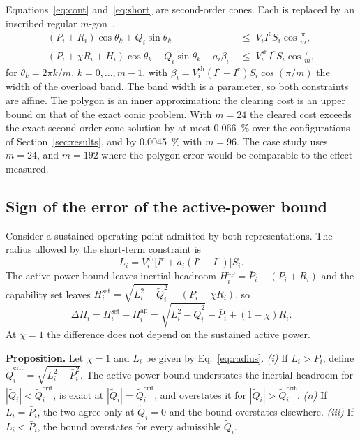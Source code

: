 Equations~\eqref{eq:cont} and~\eqref{eq:short} are second-order cones. Each
is replaced by an inscribed regular $m$-gon~\cite{bental2001polyhedral},
%
\begin{align}
  (P_i + R_i)\cos\theta_k + Q_i \sin\theta_k
    &\;\le\; V_i I^{\mathrm{c}} S_i \cos\tfrac{\pi}{m} ,
  \label{eq:polygon} \\
  (P_i + \chi R_i + H_i)\cos\theta_k + \tilde{Q}_i \sin\theta_k
    - a_i \beta_i
    &\;\le\; V^{\mathrm{sh}}_i I^{\mathrm{c}} S_i \cos\tfrac{\pi}{m} ,
  \label{eq:polygon-short}
\end{align}
%
for $\theta_k = 2\pi k / m$, $k = 0, \dots, m-1$, with
$\beta_i = V^{\mathrm{sh}}_i (I^{\mathrm{s}} - I^{\mathrm{c}}) S_i
\cos(\pi/m)$ the width of the overload band. The band width is a parameter,
so both constraints are affine. The polygon is an inner approximation: the
clearing cost is an upper bound on that of the exact conic problem. With
$m = 24$ the cleared cost exceeds the exact second-order cone solution by at
most \SI{0.066}{\percent} over the configurations of
Section~\ref{sec:results}, and by \SI{0.0045}{\percent} with $m = 96$. The case
study uses $m = 24$, and $m = 192$ where the polygon error would be comparable
to the effect measured.

\subsection{Sign of the error of the active-power bound}
\label{sec:sign}

Consider a sustained operating point admitted by both representations. The
radius allowed by the short-term constraint is
%
\begin{equation}
  L_i = V^{\mathrm{sh}}_i \big[ I^{\mathrm{c}}
        + a_i (I^{\mathrm{s}} - I^{\mathrm{c}}) \big] S_i .
  \label{eq:radius}
\end{equation}
%
The active-power bound leaves inertial headroom
$H^{\mathrm{ap}}_i = \bar{P}_i - (P_i + R_i)$ and the capability set leaves
$H^{\mathrm{set}}_i = \sqrt{L_i^2 - \tilde{Q}_i^2} - (P_i + \chi R_i)$, so
%
\begin{equation}
  \Delta H_i = H^{\mathrm{set}}_i - H^{\mathrm{ap}}_i
    = \sqrt{L_i^2 - \tilde{Q}_i^2} - \bar{P}_i + (1 - \chi) R_i .
  \label{eq:difference}
\end{equation}
%
At $\chi = 1$ the difference does not depend on the sustained active power.

\medskip
\noindent\textbf{Proposition.} Let $\chi = 1$ and $L_i$ be given by
Eq.~\eqref{eq:radius}.
\emph{(i)} If $L_i > \bar{P}_i$, define
$\tilde{Q}^{\mathrm{crit}}_i = \sqrt{L_i^2 - \bar{P}_i^2}$. The active-power
bound understates the inertial headroom for
$|\tilde{Q}_i| < \tilde{Q}^{\mathrm{crit}}_i$, is exact at
$|\tilde{Q}_i| = \tilde{Q}^{\mathrm{crit}}_i$, and overstates it for
$|\tilde{Q}_i| > \tilde{Q}^{\mathrm{crit}}_i$.
\emph{(ii)} If $L_i = \bar{P}_i$, the two agree only at $\tilde{Q}_i = 0$ and
the bound overstates elsewhere.
\emph{(iii)} If $L_i < \bar{P}_i$, the bound overstates for every admissible
$\tilde{Q}_i$.
\medskip


